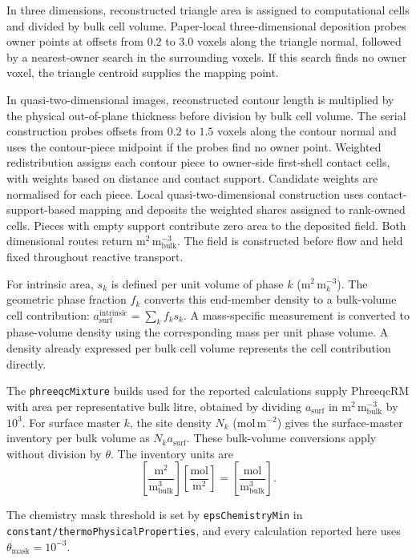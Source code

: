 \documentclass[pdflatex,sn-basic]{sn-jnl}
\begin{document}
In three dimensions, reconstructed triangle area is assigned to computational
cells and divided by bulk cell volume. Paper-local three-dimensional
deposition probes owner points at offsets from $0.2$ to $3.0$ voxels along
the triangle normal, followed by a nearest-owner search in the surrounding
voxels. If this search finds no owner voxel, the triangle centroid supplies
the mapping point.

In quasi-two-dimensional images, reconstructed contour length is multiplied
by the physical out-of-plane thickness before division by bulk cell volume.
The serial construction probes offsets from $0.2$ to $1.5$ voxels along the
contour normal and uses the contour-piece midpoint if the probes find no
owner point. Weighted redistribution assigns each contour piece to
owner-side first-shell contact cells, with weights based on distance and
contact support. Candidate weights are normalised for each piece.
Local quasi-two-dimensional construction uses contact-support-based mapping
and deposits the weighted shares assigned to rank-owned cells. Pieces with
empty support contribute zero area to the deposited field. Both dimensional
routes return m$^2$\,m$^{-3}_{\mathrm{bulk}}$. The field is constructed before
flow and held fixed throughout reactive transport.

For intrinsic area, $s_k$ is defined per unit volume of phase $k$
(m$^2$\,m$^{-3}_{k}$). The geometric phase fraction $f_k$ converts this
end-member density to a bulk-volume cell contribution:
$a_{\mathrm{surf}}^{\mathrm{intrinsic}}=\sum_k f_k s_k$.
A mass-specific measurement is converted to phase-volume density using the
corresponding mass per unit phase volume. A density already expressed per
bulk cell volume represents the cell contribution directly.

The \texttt{phreeqcMixture} builds used for the reported calculations supply
PhreeqcRM \citep{parkhurst2015phreeqcrm} with area per representative bulk
litre, obtained by dividing $a_{\mathrm{surf}}$ in
m$^2$\,m$^{-3}_{\mathrm{bulk}}$ by $10^3$. For surface master $k$, the site
density $N_k$ (mol\,m$^{-2}$) gives the surface-master inventory per bulk
volume as $N_k a_{\mathrm{surf}}$. These bulk-volume conversions apply
without division by $\theta$. The inventory units are
\[
\left[\frac{\mathrm{m}^2}{\mathrm{m}^3_{\mathrm{bulk}}}\right]
\left[\frac{\mathrm{mol}}{\mathrm{m}^2}\right]
=\left[\frac{\mathrm{mol}}{\mathrm{m}^3_{\mathrm{bulk}}}\right].
\]

The chemistry mask threshold is set by \texttt{epsChemistryMin} in
\texttt{constant/thermoPhysicalProperties}, and every calculation reported here
uses $\theta_{\mathrm{mask}}=10^{-3}$.
\end{document}
